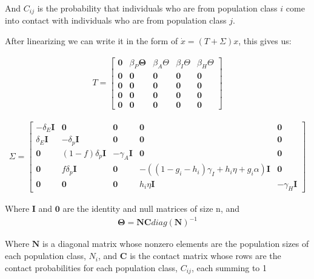 \documentclass{article}
\begin{document}
And $C_{ij}$ is the probability that individuals who are from population class $i$ come into contact with individuals who are from population class $j$.

\noindent
After linearizing we can write it in the form of $\dot{x} = (T + \Sigma) x$, this gives us:

\begin{gather}
 T =
  \begin{bmatrix}
   \boldsymbol{0} & \beta_P \boldsymbol{\Theta} & 
   \beta_A {\Theta} &
   \beta_I {\Theta} &
   \beta_H {\Theta} \\
   \boldsymbol{0} & \boldsymbol{0} & \boldsymbol{0} & \boldsymbol{0} & \boldsymbol{0} \\
   \boldsymbol{0} & \boldsymbol{0} & \boldsymbol{0} & \boldsymbol{0} & \boldsymbol{0} \\
   \boldsymbol{0} & \boldsymbol{0} & \boldsymbol{0} & \boldsymbol{0} & \boldsymbol{0} \\
   \boldsymbol{0} & \boldsymbol{0} & \boldsymbol{0} & \boldsymbol{0} & \boldsymbol{0}
   \end{bmatrix}
\end{gather}

\begin{gather}
 \Sigma =
  \begin{bmatrix}
   - \delta_E \boldsymbol{I} & \boldsymbol{0} & \boldsymbol{0} & \boldsymbol{0} & \boldsymbol{0} \\
   \delta_E \boldsymbol{I}& -\delta_p \boldsymbol{I} & \boldsymbol{0} & \boldsymbol{0} & \boldsymbol{0} \\
   \boldsymbol{0} & (1-f) \delta_p \boldsymbol{I} & -\gamma_A \boldsymbol{I} & \boldsymbol{0} & \boldsymbol{0} \\
   \boldsymbol{0} & f \delta_p \boldsymbol{I} & \boldsymbol{0} & - ((1-g_i-h_i) \gamma_{I} + h_i \eta + g_i \alpha) \boldsymbol{I} & \boldsymbol{0} \\
   \boldsymbol{0} & \boldsymbol{0} & \boldsymbol{0} & h_i \eta \boldsymbol{I} & -\gamma_H \boldsymbol{I}
   \end{bmatrix}
\end{gather}

Where $\boldsymbol{I}$ and $\boldsymbol{0}$ are the identity and null matrices of size n, and 
\begin{gather*}
   \boldsymbol{\Theta} = \boldsymbol{N}\boldsymbol{C} diag(\boldsymbol{N})^{-1}
\end{gather*}

Where $\boldsymbol{N}$ is a diagonal matrix whose nonzero elements are the population sizes of each population class, $N_i$, and $\boldsymbol{C}$ is the contact matrix whose rows are the contact probabilities for each population class, $C_{ij}$, each summing to 1
\end{document}
